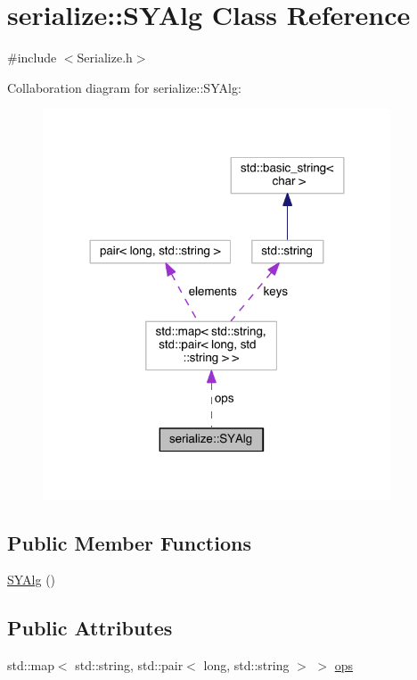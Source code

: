 \hypertarget{classserialize_1_1_s_y_alg}{}\section{serialize\+:\+:S\+Y\+Alg Class Reference}
\label{classserialize_1_1_s_y_alg}


{\ttfamily \#include $<$Serialize.\+h$>$}



Collaboration diagram for serialize\+:\+:S\+Y\+Alg\+:
\nopagebreak
\begin{figure}[H]
\begin{center}
\leavevmode
\includegraphics[width=293pt]{classserialize_1_1_s_y_alg__coll__graph}
\end{center}
\end{figure}
\subsection*{Public Member Functions}
\begin{DoxyCompactItemize}
\item 
\hyperlink{classserialize_1_1_s_y_alg_a0e57b976c122fc29293c26e3e4c3ae55}{S\+Y\+Alg} ()
\end{DoxyCompactItemize}
\subsection*{Public Attributes}
\begin{DoxyCompactItemize}
\item 
std\+::map$<$ std\+::string, std\+::pair$<$ long, std\+::string $>$ $>$ \hyperlink{classserialize_1_1_s_y_alg_a1e3689b2ee1e8e0f088407e854fca3ab}{ops}
\end{DoxyCompactItemize}


